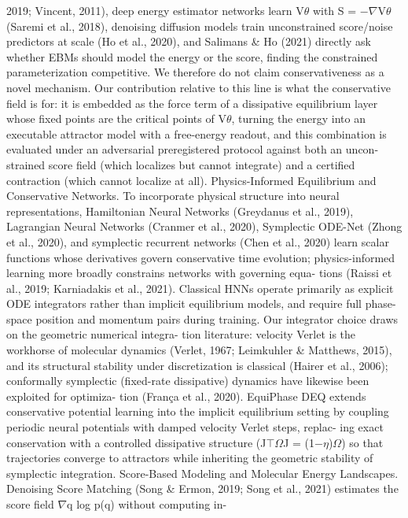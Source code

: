 \documentclass{article}
\begin{document}
2019; Vincent, 2011), deep energy estimator networks learn V$\theta$ with S = $-$$\nabla$V$\theta$ (Saremi et al.,
2018), denoising diffusion models train unconstrained score/noise predictors at scale (Ho et al.,
2020), and Salimans \& Ho (2021) directly ask whether EBMs should model the energy or the score,
finding the constrained parameterization competitive. We therefore do not claim conservativeness
as a novel mechanism. Our contribution relative to this line is what the conservative field is for: it
is embedded as the force term of a dissipative equilibrium layer whose fixed points are the critical
points of V$\theta$, turning the energy into an executable attractor model with a free-energy readout, and
this combination is evaluated under an adversarial preregistered protocol against both an uncon-
strained score field (which localizes but cannot integrate) and a certified contraction (which cannot
localize at all).
Physics-Informed Equilibrium and Conservative Networks.
To incorporate physical structure
into neural representations, Hamiltonian Neural Networks (Greydanus et al., 2019), Lagrangian
Neural Networks (Cranmer et al., 2020), Symplectic ODE-Net (Zhong et al., 2020), and symplectic
recurrent networks (Chen et al., 2020) learn scalar functions whose derivatives govern conservative
time evolution; physics-informed learning more broadly constrains networks with governing equa-
tions (Raissi et al., 2019; Karniadakis et al., 2021). Classical HNNs operate primarily as explicit
ODE integrators rather than implicit equilibrium models, and require full phase-space position and
momentum pairs during training. Our integrator choice draws on the geometric numerical integra-
tion literature: velocity Verlet is the workhorse of molecular dynamics (Verlet, 1967; Leimkuhler
\& Matthews, 2015), and its structural stability under discretization is classical (Hairer et al., 2006);
conformally symplectic (fixed-rate dissipative) dynamics have likewise been exploited for optimiza-
tion (Fran\c{c}a et al., 2020). EquiPhase DEQ extends conservative potential learning into the implicit
equilibrium setting by coupling periodic neural potentials with damped velocity Verlet steps, replac-
ing exact conservation with a controlled dissipative structure (J$\top$$\Omega$J = (1$-$$\eta$)$\Omega$) so that trajectories
converge to attractors while inheriting the geometric stability of symplectic integration.
Score-Based Modeling and Molecular Energy Landscapes.
Denoising Score Matching (Song
\& Ermon, 2019; Song et al., 2021) estimates the score field $\nabla$q log p(q) without computing in-
$$
\end{document}
